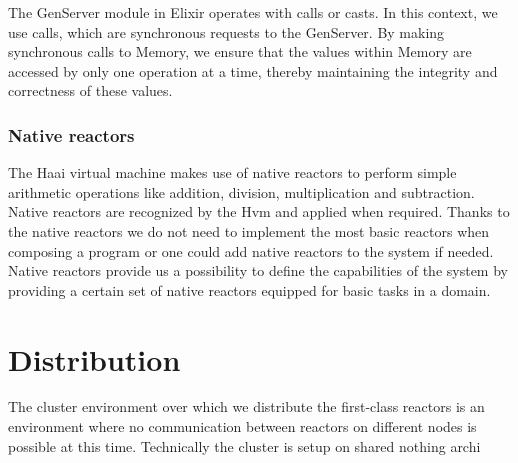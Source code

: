 \documentclass[a4paper]{book}
\begin{document}
The GenServer module in Elixir operates with calls or casts. In this context, we use calls, which are synchronous requests to the GenServer. By making synchronous calls to Memory, we ensure that the values within Memory are accessed by only one operation at a time, thereby maintaining the integrity and correctness of these values.

\subsection{Native reactors}
The Haai virtual machine makes use of native reactors to perform simple arithmetic operations like addition, division, multiplication and subtraction. Native reactors are recognized by the Hvm and applied when required. Thanks to the native reactors we do not need to implement the most basic reactors when composing a program or one could add native reactors to the system if needed. Native reactors provide us a possibility to define the capabilities of the system by providing a certain set of native reactors equipped for basic tasks in a domain.

\chapter{Distribution} \label{sec:distribution}
The cluster environment over which we distribute the first-class reactors is an environment where no communication between reactors on different nodes is possible at this time. Technically the cluster is setup on shared nothing archi
\end{document}
